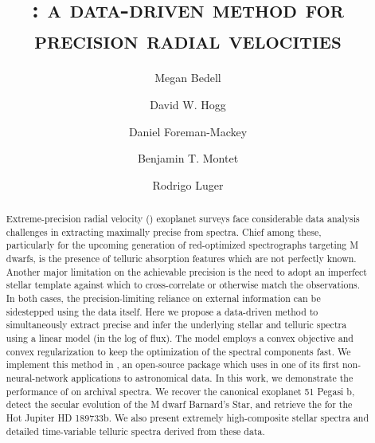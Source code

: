 \documentclass[modern]{aastex62}
\newcommand{\Mdwarf}{Barnard's Star\xspace} %
\begin{document}
\sloppy\sloppypar\raggedbottom\frenchspacing %

\shorttitle{\wobble}

\graphicspath{ {figures/} }

\title{\textsc{\wobble: a data-driven method for precision radial velocities}}

\author[0000-0001-9907-7742]{Megan Bedell}
\affiliation{\flatiron}

\author[0000-0003-2866-9403]{David W. Hogg}
\affiliation{\flatiron}

\author[0000-0002-9328-5652]{Daniel Foreman-Mackey}
\affiliation{\flatiron}

\author[0000-0001-7516-8308]{Benjamin T. Montet}
\affiliation{\chicago}

\author[0000-0002-0296-3826]{Rodrigo Luger}
\affiliation{\flatiron}


\begin{abstract}
Extreme-precision radial velocity (\EPRV) exoplanet surveys face considerable data analysis challenges in extracting maximally precise \RVs from spectra. 
Chief among these, particularly for the upcoming generation of red-optimized spectrographs targeting M dwarfs, is the presence of telluric absorption features which are not perfectly known. 
Another major limitation on the achievable \RV precision is the need to adopt an imperfect stellar template against which to cross-correlate or otherwise match the observations. 
In both cases, the precision-limiting reliance on external information can be sidestepped using the data itself. 
Here we propose a data-driven method to simultaneously extract precise \RVs and infer the underlying stellar and telluric spectra using a linear model (in the log of flux). 
The model employs a convex objective and convex regularization to keep the optimization of the spectral components fast. 
We implement this method in \wobble, an open-source \python package which uses \TF in one of its first non-neural-network applications to astronomical data. 
In this work, we demonstrate the performance of \wobble on archival \HARPS spectra.
We recover the canonical exoplanet 51 Pegasi b, detect the secular \RV evolution of the M dwarf \Mdwarf, and retrieve the \RM for the Hot Jupiter HD 189733b. 
We also present extremely high-\SNR composite stellar spectra and detailed time-variable telluric spectra derived from these data. 
\end{abstract}
\end{document}
